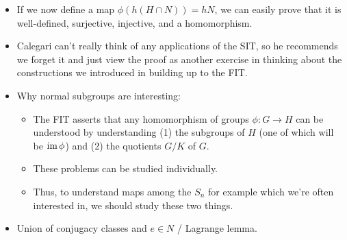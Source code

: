 \documentclass[../notes.tex]{subfiles}
\begin{document}
\begin{itemize}
    \item If we now define a map $\phi(h(H\cap N))=hN$, we can easily prove that it is well-defined, surjective, injective, and a homomorphism.
    \item Calegari can't really think of any applications of the SIT, so he recommends we forget it and just view the proof as another exercise in thinking about the constructions we introduced in building up to the FIT.
    \item Why normal subgroups are interesting:
    \begin{itemize}
        \item The FIT asserts that any homomorphism of groups $\phi:G\to H$ can be understood by understanding (1) the subgroups of $H$ (one of which will be $\operatorname{im}\phi$) and (2) the quotients $G/K$ of $G$.
        \item These problems can be studied individually.
        \item Thus, to understand maps among the $S_n$ for example which we're often interested in, we should study these two things.
    \end{itemize}
    \item Union of conjugacy classes and $e\in N$ / Lagrange lemma.
\end{itemize}
\end{document}
